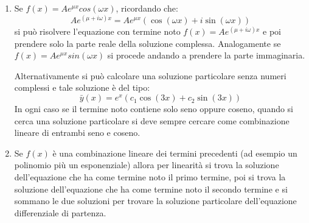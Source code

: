 \documentclass{article}
\begin{document}
\begin{enumerate}
\begin{enumerate}
    \item Se \( f(x) = A e^{\mu x} cos(\omega x) \),
      ricordando che:
      \[
        A e^{(\mu + i \omega)x} = A e^{\mu x} \left(\cos(\omega x) + i \sin(\omega x)\right)
      \] 
      si può risolvere l'equazione con termine noto \( f(x) = A e^{(\mu + i \omega)x} \)
      e poi prendere solo la parte reale della soluzione complessa. Analogamente se
      \( f(x) = A e^{\mu x} sin(\omega x) \) si procede andando a prendere la parte
      immaginaria.

      Alternativamente si può calcolare una soluzione particolare senza numeri complessi
      e tale soluzione è del tipo:
      \[
        \bar{y}(x) = e^{x} \left( c_1 \cos(3x) + c_2 \sin(3x) \right) 
      \] 
      In ogni caso se il termine noto contiene solo seno oppure coseno, quando si cerca 
      una soluzione particolare si deve sempre cercare come combinazione lineare di 
      entrambi seno e coseno.

    \item Se \( f(x) \) è una combinazione lineare dei termini precedenti (ad esempio
      un polinomio più un esponenziale) allora per linearità si trova la soluzione
      dell'equazione che ha come termine noto il primo termine, poi si trova la soluzione
      dell'equazione che ha come termine noto il secondo termine e si sommano le due
      soluzioni per trovare la soluzione particolare dell'equazione differenziale di partenza.
    \end{enumerate}
\end{enumerate}
    
\end{document}
